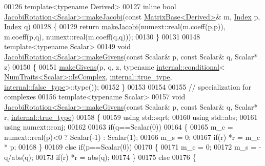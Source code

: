 \begin{DoxyCode}
00126 \textcolor{keyword}{template}<\textcolor{keyword}{typename} Derived>
00127 \textcolor{keyword}{inline} \textcolor{keywordtype}{bool} \hyperlink{group___jacobi___module_a69076401f22e883dc76b6ff9074ac669}{JacobiRotation<Scalar>::makeJacobi}(\textcolor{keyword}{const} 
      \hyperlink{group___core___module_class_eigen_1_1_matrix_base}{MatrixBase<Derived>}& m, \hyperlink{namespace_eigen_a62e77e0933482dafde8fe197d9a2cfde}{Index} p, \hyperlink{namespace_eigen_a62e77e0933482dafde8fe197d9a2cfde}{Index} q)
00128 \{
00129   \textcolor{keywordflow}{return} \hyperlink{group___jacobi___module_a69076401f22e883dc76b6ff9074ac669}{makeJacobi}(numext::real(m.coeff(p,p)), m.coeff(p,q), numext::real(m.coeff(q,q)));
00130 \}
00131 
00148 \textcolor{keyword}{template}<\textcolor{keyword}{typename} Scalar>
00149 \textcolor{keywordtype}{void} \hyperlink{group___jacobi___module_af73c81e9cc139b7e0d877ce553b02ec0}{JacobiRotation<Scalar>::makeGivens}(\textcolor{keyword}{const} Scalar& p, \textcolor{keyword}{const} Scalar& q,
       Scalar* z)
00150 \{
00151   \hyperlink{group___jacobi___module_af73c81e9cc139b7e0d877ce553b02ec0}{makeGivens}(p, q, z, \textcolor{keyword}{typename} \hyperlink{struct_eigen_1_1internal_1_1conditional}{internal::conditional}<
      \hyperlink{group___core___module_struct_eigen_1_1_num_traits}{NumTraits<Scalar>::IsComplex}, \hyperlink{struct_eigen_1_1internal_1_1true__type}{internal::true\_type}, 
      \hyperlink{struct_eigen_1_1internal_1_1false__type}{internal::false\_type}>::type());
00152 \}
00153 
00154 
00155 \textcolor{comment}{// specialization for complexes}
00156 \textcolor{keyword}{template}<\textcolor{keyword}{typename} Scalar>
00157 \textcolor{keywordtype}{void} \hyperlink{group___jacobi___module_af73c81e9cc139b7e0d877ce553b02ec0}{JacobiRotation<Scalar>::makeGivens}(\textcolor{keyword}{const} Scalar& p, \textcolor{keyword}{const} Scalar& q,
       Scalar* r, \hyperlink{struct_eigen_1_1internal_1_1true__type}{internal::true\_type})
00158 \{
00159   \textcolor{keyword}{using} std::sqrt;
00160   \textcolor{keyword}{using} std::abs;
00161   \textcolor{keyword}{using} numext::conj;
00162   
00163   \textcolor{keywordflow}{if}(q==Scalar(0))
00164   \{
00165     m\_c = numext::real(p)<0 ? Scalar(-1) : Scalar(1);
00166     m\_s = 0;
00167     \textcolor{keywordflow}{if}(r) *r = m\_c * p;
00168   \}
00169   \textcolor{keywordflow}{else} \textcolor{keywordflow}{if}(p==Scalar(0))
00170   \{
00171     m\_c = 0;
00172     m\_s = -q/abs(q);
00173     \textcolor{keywordflow}{if}(r) *r = abs(q);
00174   \}
00175   \textcolor{keywordflow}{else}
00176   \{

\end{DoxyCode}
